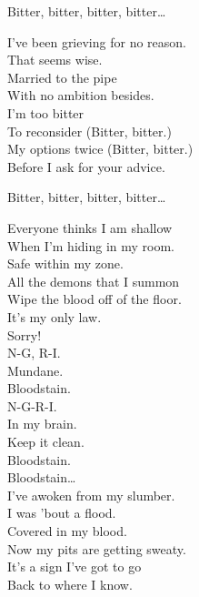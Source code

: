 
Bitter, bitter, bitter, bitter… \\


I've been grieving for no reason. \\
That seems wise. \\
Married to the pipe \\
With no ambition besides. \\

I'm too bitter \\
To reconsider (Bitter, bitter.) \\
My options twice (Bitter, bitter.) \\
Before I ask for your advice. \\


Bitter, bitter, bitter, bitter… \\




Everyone thinks I am shallow \\
When I'm hiding in my room. \\
Safe within my zone. \\
All the demons that I summon \\
Wipe the blood off of the floor. \\
It's my only law. \\

Sorry! \\

N-G, R-I. \\
Mundane. \\
Bloodstain. \\
N-G-R-I. \\
In my brain. \\
Keep it clean. \\
Bloodstain. \\

Bloodstain… \\

I've awoken from my slumber. \\
I was  'bout a flood. \\
Covered in my blood. \\
Now my pits are getting sweaty. \\
It's a sign I've got to go \\
Back to where I know. \\

